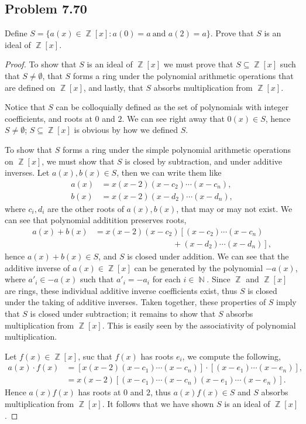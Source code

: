 \documentclass[letterpaper, 12pt]{amsart}
\DeclareMathOperator{\N}{\mathbb{N}}
\DeclareMathOperator{\Z}{\mathbb{Z}}
\begin{document}
		\subsection*{Problem 7.70}
		\label{sub:problem_7_70}
		Define $S = \{ a(x) \in \Z[x] : a(0) = a \ \text{and } a(2) = a \}$. 
		Prove that $S$ is an ideal of $\Z[x]$.
			\begin{proof}
			To show that $S$ is an ideal of $\Z[x]$ we must prove that $S \subseteq \Z[x]$ such that $S \neq \emptyset$, that $S$ forms a ring under the polynomial arithmetic operations that are defined on $\Z[x]$, and lastly, that $S$ absorbs multiplication from $\Z[x]$.

			Notice that $S$ can be colloquially defined as the set of polynomials with integer coefficients, and roots at $0$ and $2$.
			We can see right away that $0(x) \in S$, hence $S \neq \emptyset$; $S \subseteq \Z[x]$ is obvious by how we defined $S$.

			To show that $S$ forms a ring under the simple polynomial arithmetic operations on $\Z[x]$, we must show that $S$ is closed by subtraction, and under additive inverses.
			Let $a(x),b(x) \in S$, then we can write them like
			\begin{align*}
			a(x) &= x(x-2)(x-c_{2})\cdots(x-c_{n}), \\
			b(x) &= x(x-2)(x-d_{2})\cdots(x-d_{n}),
			\end{align*}
			where $c_{i}, d_{i}$ are the other roots of $a(x), b(x)$, that may or may not exist.
			We can see that polynomial additition preserves roots,
			\begin{align*}
			a(x) + b(x) &= x(x-2)(x-c_{2})\left[ (x-c_{2})\cdots(x-c_{n}) \right. \\
			& \left. \hspace{4cm} + (x-d_{2})\cdots(x-d_{n}) \right],
			\end{align*}
			hence $a(x) + b(x) \in S$, and $S$ is closed under addition.
			We can see that the additive inverse of $a(x) \in \Z[x]$ can be generated by the polynomial $-a(x)$, where $a'_{i} \in -a(x)$ such that $a'_{i} = -a_{i}$ for each $i \in \N$.
			Since $\Z$ and $\Z[x]$ are rings, these individual additive inverse coefficients exist, thus $S$ is closed under the taking of additive inverses.
			Taken together, these properties of $S$ imply that $S$ is closed under subtraction; it remains to show that $S$ absorbs multiplication from $\Z[x]$.
			This is easily seen by the associativity of polynomial multiplication.

			Let $f(x) \in \Z[x]$, suc that $f(x)$ has roots $e_{i}$, we compute the following,
			\begin{align*}
			a(x) \cdot f(x) &= [x(x-2)(x-c_{1})\cdots(x-c_{n})] \cdot [(x-e_{1})\cdots(x-e_{n})], \\
			&= x(x-2) [(x-c_{1})\cdots(x-c_{n})(x-e_{1})\cdots(x-e_{n})].
			\end{align*}
			Hence $a(x)f(x)$ has roots at $0$ and $2$, thus $a(x)f(x) \in S$ and $S$ absorbs multiplication from $\Z[x]$.
			It follows that we have shown $S$ is an ideal of $\Z[x]$. 
			\end{proof}
\end{document}
